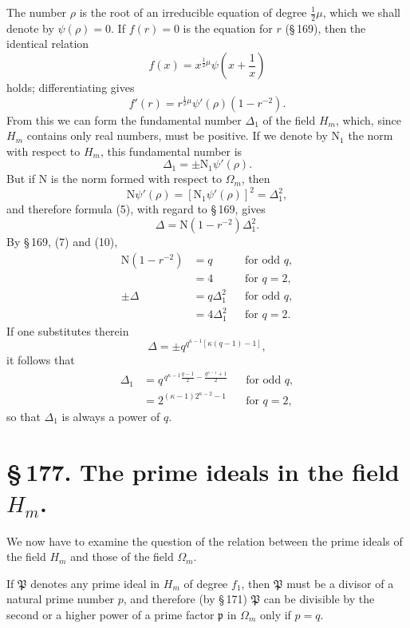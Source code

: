 \documentclass[11pt]{article}
\newcommand{\Norm}{\mathrm{N}}
\newcommand{\Normone}{\mathrm{N}_1}
\newcommand{\frp}{\mathfrak p}
\newcommand{\frP}{\mathfrak P}
\begin{document}
The number $\rho$ is the root of an irreducible equation of degree $\frac12\mu$, which we shall denote by $\psi(\rho)=0$. If $f(r)=0$ is the equation for $r$ (\S\,169), then the identical relation
\begin{equation}
f(x)=x^{\frac12\mu}\psi\left(x+\frac1x\right)
\tag{4}
\end{equation}
holds; differentiating gives
\begin{equation}
f'(r)=r^{\frac12\mu}\psi'(\rho)(1-r^{-2}).
\tag{5}
\end{equation}
From this we can form the fundamental number $\Delta_1$ of the field $H_m$, which, since $H_m$ contains only real numbers, must be positive. If we denote by $\Normone$ the norm with respect to $H_m$, this fundamental number is
\[
\Delta_1=\pm\Normone\psi'(\rho).
\]
But if $\Norm$ is the norm formed with respect to $\Omega_m$, then
\[
\Norm\psi'(\rho)=[\Normone\psi'(\rho)]^2=\Delta_1^2,
\]
and therefore formula (5), with regard to \S\,169, gives
\[
\Delta=\Norm(1-r^{-2})\Delta_1^2.
\]
By \S\,169, (7) and (10),
\begin{equation}
\begin{aligned}
\Norm(1-r^{-2})&=q &&\text{for odd }q,\\
&=4 &&\text{for }q=2,\\
\pm\Delta&=q\Delta_1^2 &&\text{for odd }q,\\
&=4\Delta_1^2 &&\text{for }q=2.
\end{aligned}
\tag{6}
\end{equation}
If one substitutes therein
\[
\Delta=\pm q^{q^{\kappa-1}[\kappa(q-1)-1]},
\]
it follows that
\begin{equation}
\begin{aligned}
\Delta_1&=q^{\,q^{\kappa-1}\frac{q-1}{2}-\frac{q^{\kappa-1}+1}{2}} &&\text{for odd }q,\\
&=2^{(\kappa-1)2^{\kappa-2}-1} &&\text{for }q=2,
\end{aligned}
\tag{7}
\end{equation}
so that $\Delta_1$ is always a power of $q$.

\section*{\S\,177. The prime ideals in the field $H_m$.}

We now have to examine the question of the relation between the prime ideals of the field $H_m$ and those of the field $\Omega_m$.

If $\frP$ denotes any prime ideal in $H_m$ of degree $f_1$, then $\frP$ must be a divisor of a natural prime number $p$, and therefore (by \S\,171) $\frP$ can be divisible by the second or a higher power of a prime factor $\frp$ in $\Omega_m$ only if $p=q$.
\end{document}
